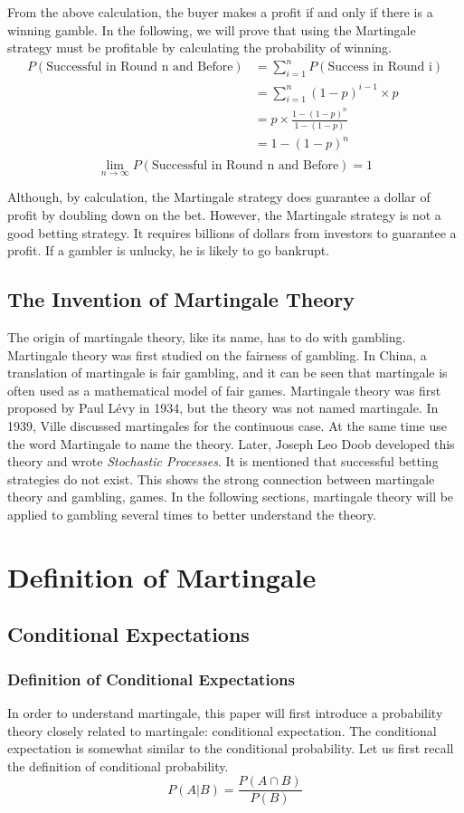 \documentclass[11pt]{article} %
\begin{document}
From the above calculation, the buyer makes a profit if and only if there is a winning gamble. In the following, we will prove that using the Martingale strategy must be profitable by calculating the probability of winning.
$$	
\begin{aligned}
P(\text{Successful in Round n and Before}) &= \sum_{i=1}^{n}P(\text{Success in Round i}) \\
&=\sum_{i=1}^{n}(1-p)^{i-1}\times p \\
&=p \times \frac{1-(1-p)^n}{1-(1-p)}\\
&=1-(1-p)^n\\
\end{aligned}
$$
$$
\lim_{n\to \infty}P(\text{Successful in Round n and Before}) = 1
$$

Although, by calculation, the Martingale strategy does guarantee a dollar of profit by doubling down on the bet. However, the Martingale strategy is not a good betting strategy. It requires billions of dollars from investors to guarantee a profit. If a gambler is unlucky, he is likely to go bankrupt.
\subsection{The Invention of Martingale Theory}

The origin of martingale theory, like its name, has to do with gambling. Martingale theory was first studied on the fairness of gambling. In China, a translation of martingale is fair gambling, and it can be seen that martingale is often used as a mathematical model of fair games. Martingale theory was first proposed by Paul Lévy in 1934, but the theory was not named martingale. In 1939, Ville discussed martingales for the continuous case. At the same time use the word Martingale to name the theory. Later, Joseph Leo Doob developed this theory and wrote \textit{Stochastic Processes}. It is mentioned that successful betting strategies do not exist. This shows the strong connection between martingale theory and gambling, games. In the following sections, martingale theory will be applied to gambling several times to better understand the theory.
\section{Definition of Martingale}
\subsection{Conditional Expectations}
\subsubsection{Definition of Conditional Expectations}
In order to understand martingale, this paper will first introduce a probability theory closely related to martingale: conditional expectation.\cite{lable1} The conditional expectation is somewhat similar to the conditional probability. Let us first recall the definition of conditional probability.
$$
P(A|B) = \frac{P(A\cap B)}{P(B)}
$$
\end{document}
